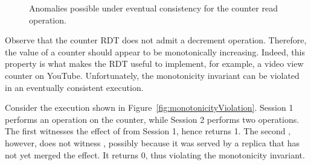 \begin{figure}[ht]
\centering
{}
\hspace*{0.5in}
\hfill
\caption{Anomalies possible under eventual consistency for the counter
read operation.}
\label{fig:counter_anomalies}
\end{figure}

Observe that the counter RDT does not admit a decrement operation.
Therefore, the value of a counter should appear to be monotonically
increasing. Indeed, this property is what makes the RDT useful to
implement, for example, a video view counter on YouTube.
Unfortunately, the monotonicity invariant can be violated in an
eventually consistent execution.

Consider the execution shown in
Figure~\ref{fig:monotonicityViolation}. Session 1 performs an
 operation on the counter, while Session 2 performs two
 operations. The first  witnesses the effect of
 from Session 1, hence returns 1. The second ,
however, does not witness , possibly because it was served by
a replica that has not yet merged the  effect. It returns 0,
thus violating the monotonicity invariant. 

